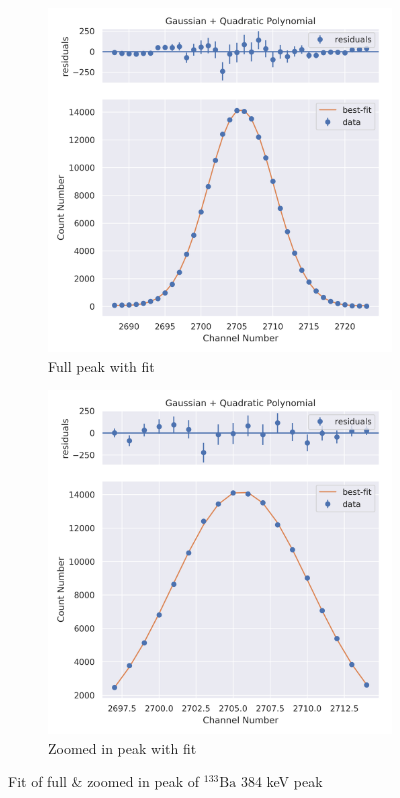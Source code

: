 \documentclass[11pt,a4paper]{article}
\newcommand{\element}[2]{$^{#2}\textrm{#1}$}
\begin{document}
\begin{figure}[H]
  \centering
  \begin{subfigure}{.5\linewidth}
    \centering
    \includegraphics[width=\linewidth]{./Images/Barium133/Quad/Quad_7_Full.png}
    \caption{Full peak with fit}
  \end{subfigure}%
  \begin{subfigure}{.5\linewidth}
    \centering
    \includegraphics[width=\linewidth]{./Images/Barium133/Quad/Quad_7_Zoom.png}
    \caption{Zoomed in peak with fit}
  \end{subfigure}
  \caption{Fit of full \& zoomed in peak of \element{Ba}{133} 384 keV peak}
\end{figure}
\clearpage
\end{document}
